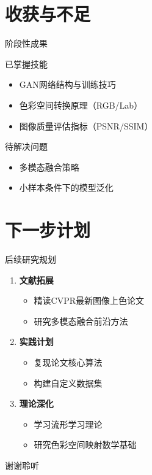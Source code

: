 \documentclass[aspectratio=169,AutoFakeBold]{beamer}
\begin{document}
\section{收获与不足}
\begin{frame}{阶段性成果}
    \begin{textbox}{已掌握技能}
        \begin{itemize}
            \item GAN网络结构与训练技巧
            \item 色彩空间转换原理（RGB/Lab）
            \item 图像质量评估指标（PSNR/SSIM）
        \end{itemize}
    \end{textbox}
    
    \begin{textbox}{待解决问题}
        \begin{itemize}
            \item 多模态融合策略
            \item 小样本条件下的模型泛化
        \end{itemize} 
    \end{textbox}
\end{frame}

\section{下一步计划}
\begin{frame}{后续研究规划}
    \begin{enumerate}
        \item \textbf{文献拓展}
            \begin{itemize}
                \item 精读CVPR最新图像上色论文
                \item 研究多模态融合前沿方法
            \end{itemize}
        \item \textbf{实践计划}
            \begin{itemize}
                \item 复现论文核心算法
                \item 构建自定义数据集
            \end{itemize}
        \item \textbf{理论深化}
            \begin{itemize}
                \item 学习流形学习理论
                \item 研究色彩空间映射数学基础
            \end{itemize}
    \end{enumerate}
\end{frame}

\begin{frame}
    \Background
    \begin{center}
        {\Huge\calligra 谢谢聆听}
    \end{center}
\end{frame}
\end{document}
